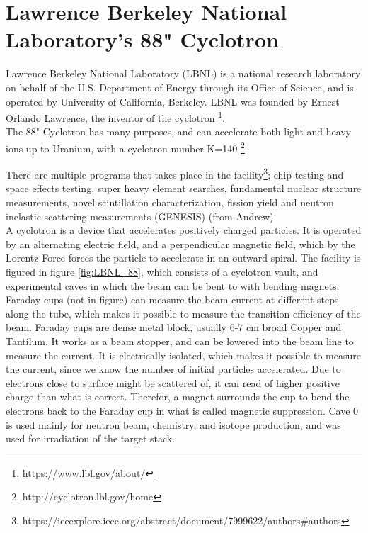 \documentclass[a4paper,11pt,twoside]{book}
\begin{document}
\section{Lawrence Berkeley National Laboratory's 88" Cyclotron}

Lawrence Berkeley National Laboratory (LBNL) is a national research laboratory on behalf of the U.S. Department of Energy through its Office of Science, and is operated by University of California, Berkeley. LBNL was founded by Ernest Orlando Lawrence, the inventor of the cyclotron \footnote{https://www.lbl.gov/about/}. \\ 


\noindent
The 88" Cyclotron has many purposes, and can accelerate both light and heavy ions up to Uranium, with a cyclotron number K=140  \footnote{http://cyclotron.lbl.gov/home}. %

\noindent 
There are multiple programs that takes place in the facility\footnote{https://ieeexplore.ieee.org/abstract/document/7999622/authors#authors}; chip testing and space effects testing, super heavy element searches, fundamental nuclear structure measurements, novel scintillation characterization, fission yield and neutron inelastic scattering measurements (GENESIS) (from Andrew). \\

\noindent 
A cyclotron is a device that accelerates positively charged particles. It is operated by an alternating electric field, and a perpendicular magnetic field, which by the Lorentz Force forces the particle to accelerate in an outward spiral. 
The facility is figured in figure \ref{fig:LBNL_88}, which consists of a cyclotron vault, and experimental caves in which the beam can be bent to with bending magnets. Faraday cups (not in figure) can measure the beam current at different steps along the tube, which makes it possible to measure the transition efficiency of the beam. Faraday cups are dense metal block, usually 6-7 cm broad Copper and Tantilum. It works as a beam stopper, and can be lowered into the beam line to measure the current. It is electrically isolated, which makes it possible to measure the current, since we know the number of initial particles accelerated. Due to electrons close to surface might be scattered of, it can read of higher positive charge than what is correct. Therefor, a magnet surrounds the cup to bend the electrons back to the Faraday cup in what is called magnetic suppression. Cave 0 is used mainly for neutron beam, chemistry, and isotope production, and was used for irradiation of the target stack.
\end{document}
